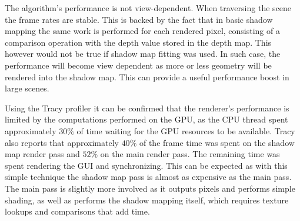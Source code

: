 The algorithm's performance is not view-dependent. When traversing the scene the frame rates are stable. This is backed by the fact that in basic shadow mapping the same work is performed for each rendered pixel, consisting of a comparison operation with the depth value stored in the depth map. This however would not be true if shadow map fitting was used. In such case, the performance will become view dependent as more or less geometry will be rendered into the shadow map. This can provide a useful performance boost in large scenes.

Using the Tracy profiler it can be confirmed that the renderer's performance is limited by the computations performed on the GPU, as the CPU thread spent approximately \(30\%\) of time waiting for the GPU resources to be available. Tracy also reports that approximately \(40\%\) of the frame time was spent on the shadow map render pass and \(52\%\) on the main render pass. The remaining time was spent rendering the GUI and synchronizing. This can be expected as with this simple technique the shadow map pass is almost as expensive as the main pass. The main pass is slightly more involved as it outputs pixels and performs simple shading, as well as performs the shadow mapping itself, which requires texture lookups and comparisons that add time.

